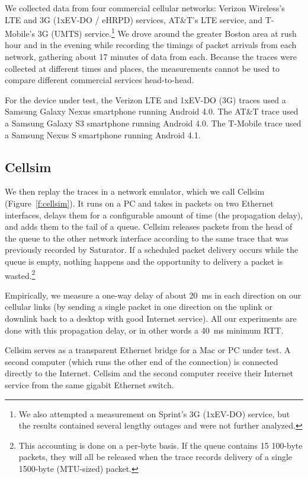 We collected data from four commercial cellular networks: Verizon
Wireless's LTE and 3G (1xEV-DO / eHRPD) services, AT\&T's LTE service,
and T-Mobile's 3G (UMTS) service.\footnote{We also attempted a
  measurement on Sprint's 3G (1xEV-DO) service, but the results
  contained several lengthy outages and were not further analyzed.} We
drove around the greater Boston area at rush hour and in the evening
while recording the timings of packet arrivals from each network,
gathering about 17 minutes of data from each. Because the traces were
collected at different times and places, the measurements cannot be
used to compare different commercial services head-to-head.

For the device under test, the Verizon LTE and 1xEV-DO (3G) traces
used a Samsung Galaxy Nexus smartphone running Android 4.0. The AT\&T
trace used a Samsung Galaxy S3 smartphone running Android 4.0. The
T-Mobile trace used a Samsung Nexus S smartphone running Android 4.1.

\subsection{Cellsim}

We then replay the traces in a network emulator, which we call
Cellsim (Figure~\ref{f:cellsim}). It runs on a PC and takes in packets
on two Ethernet interfaces, delays them for a configurable amount of
time (the propagation delay), and adds them to the tail of a
queue. Cellsim releases packets from the head of the queue to the
other network interface according to the same trace that was
previously recorded by Saturator. If a scheduled packet delivery
occurs while the queue is empty, nothing happens and the opportunity
to delivery a packet is wasted.\footnote{This accounting is done on a
  per-byte basis. If the queue contains 15 100-byte packets, they will
  all be released when the trace records delivery of a single
  1500-byte (MTU-sized) packet.}

Empirically, we measure a one-way delay of about 20~ms in each
direction on our cellular links (by sending a single packet in one
direction on the uplink or downlink back to a desktop with good
Internet service). All our experiments are done with this
propagation delay, or in other words a 40~ms minimum RTT.

Cellsim serves as a transparent Ethernet bridge for a Mac or PC under
test. A second computer (which runs the other end of the connection)
is connected directly to the Internet. Cellsim and the second computer
receive their Internet service from the same gigabit Ethernet switch.

